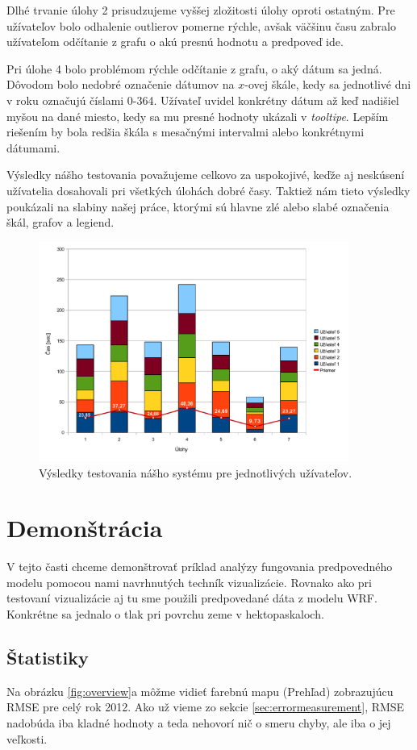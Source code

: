 Dlhé trvanie úlohy 2 prisudzujeme vyššej zložitosti úlohy oproti ostatným. Pre užívateľov bolo odhalenie outlierov pomerne rýchle, avšak väčšinu času zabralo užívateľom odčítanie z grafu o akú presnú hodnotu a predpoveď ide.

Pri úlohe 4 bolo problémom rýchle odčítanie z grafu, o aký dátum sa jedná. Dôvodom bolo nedobré označenie dátumov na \mbox{$ x $-ovej} škále, kedy sa jednotlivé dni v roku označujú číslami 0-364. Užívateľ uvidel konkrétny dátum až keď nadišiel myšou na dané miesto, kedy sa mu presné hodnoty ukázali v \textit{tooltipe}. Lepším riešením by bola redšia škála s mesačnými intervalmi alebo konkrétnymi dátumami.

Výsledky nášho testovania považujeme celkovo za uspokojivé, keďže aj neskúsení užívatelia dosahovali pri všetkých úlohách dobré časy. Taktiež nám tieto výsledky poukázali na slabiny našej práce, ktorými sú hlavne zlé alebo slabé označenia škál, grafov a legiend.


\begin{figure}
	\centering
	\includegraphics[width = 4in]{resultchart}
	\caption{Výsledky testovania nášho systému pre jednotlivých užívateľov.}
	\label{fig:results} 
\end{figure}

\section{Demonštrácia}
V tejto časti chceme demonštrovať príklad analýzy fungovania predpovedného modelu pomocou nami navrhnutých techník vizualizácie. Rovnako ako pri testovaní vizualizácie aj tu sme použili predpovedané dáta z modelu WRF. Konkrétne sa jednalo o tlak pri povrchu zeme v hektopaskaloch.

\subsection{Štatistiky}
Na obrázku \ref{fig:overview}a môžme vidieť farebnú mapu (Prehľad) zobrazujúcu RMSE pre celý rok 2012. Ako už vieme zo sekcie \ref{sec:errormeasurement}, RMSE nadobúda iba kladné hodnoty a teda nehovorí nič o smeru chyby, ale iba o jej veľkosti. 

